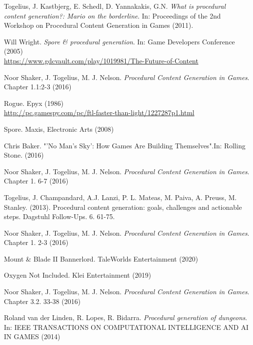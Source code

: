 \begin{thebibliography}{9}

 Togelius, J. Kastbjerg, E. Schedl, D. Yannakakis, G.N. \textit{What is procedural content generation?: Mario on the borderline}.  In: Proceedings of the 2nd Workshop on Procedural Content Generation in Games (2011).

 Will Wright. \textit{Spore \& procedural generation}. In: Game Developers Conference (2005) \\
\href{https://www.gdcvault.com/play/1019981/The-Future-of-Content}{https://www.gdcvault.com/play/1019981/The-Future-of-Content}
 
 Noor Shaker, J. Togelius, M. J. Nelson. \textit{Procedural Content Generation in Games}. Chapter 1.1:2-3 (2016)

 Rogue. Epyx (1986) \\
\href{http://pc.gamespy.com/pc/ftl-faster-than-light/1227287p1.html}{http://pc.gamespy.com/pc/ftl-faster-than-light/1227287p1.html}
 

Spore. Maxis, Electronic Arts (2008)

 Chris Baker. "'No Man's Sky': How Games Are Building Themselves".In: Rolling Stone. (2016)

 Noor Shaker, J. Togelius, M. J. Nelson. \textit{Procedural Content Generation in Games}. Chapter 1. 6-7 (2016)

 Togelius, J. Champandard, A.J. Lanzi, P. L. Mateas, M. Paiva, A. Preuss, M. Stanley. (2013). Procedural content generation: goals, challenges and actionable steps. Dagstuhl Follow-Ups. 6. 61-75. 

 Noor Shaker, J. Togelius, M. J. Nelson. \textit{Procedural Content Generation in Games}. Chapter 1. 2-3 (2016)

 Mount \& Blade II Bannerlord. TaleWorlds Entertainment (2020)

 Oxygen Not Included.  Klei Entertainment (2019)

 Noor Shaker, J. Togelius, M. J. Nelson. \textit{Procedural Content Generation in Games}. Chapter 3.2. 33-38 (2016)

 Roland van der Linden, R. Lopes, R. Bidarra. \textit{Procedural generation of dungeons}. In: IEEE TRANSACTIONS ON COMPUTATIONAL INTELLIGENCE AND AI IN GAMES (2014)


\end{thebibliography}
